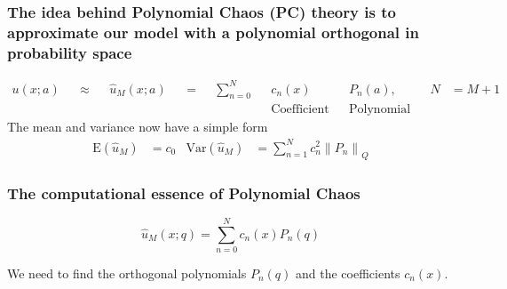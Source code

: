 \documentclass[handout]{beamer}
\newcommand{\norm}[1]{\left\lVert#1\right\rVert_{\!Q}}
\newcommand{\inner}[1]{\left\langle#1\right\rangle_{\!Q}}
\newcommand{\E}[1]{\mbox{E}\!\left(#1\right)}
\newcommand{\Var}[1]{\mbox{Var}\!\left(#1\right)}
\begin{document}
\begin{frame}
  \frametitle{The idea behind Polynomial Chaos (PC) theory is to approximate our model with a polynomial orthogonal in probability space}
  \begin{align*}
      u(x;a) & &\approx && \hat u_M(x;a) && =
      && \sum_{n=0}^N && c_n(x)\quad && P_n(a),\quad && N &= M+1\\
      &&  &&  &&  &&  && \text{Coefficient} && \text{Polynomial}
  \end{align*}
  The mean and variance now have a simple form
  \begin{align*}
        \E{\hat u_M}&=c_0
        &
        \Var{\hat u_M}&=\sum_{n=1}^N c_n^2\norm{P_n}
    \end{align*}

\end{frame}





\begin{frame}
 \frametitle{The computational essence of Polynomial Chaos}
\[\hat u_M(x;q) = \sum_{n=0}^N c_n(x) P_n(q)\]
\vspace{10mm}

 We need to find the orthogonal polynomials $P_n(q)$ and the coefficients $c_n(x)$.

\end{frame}
\end{document}
